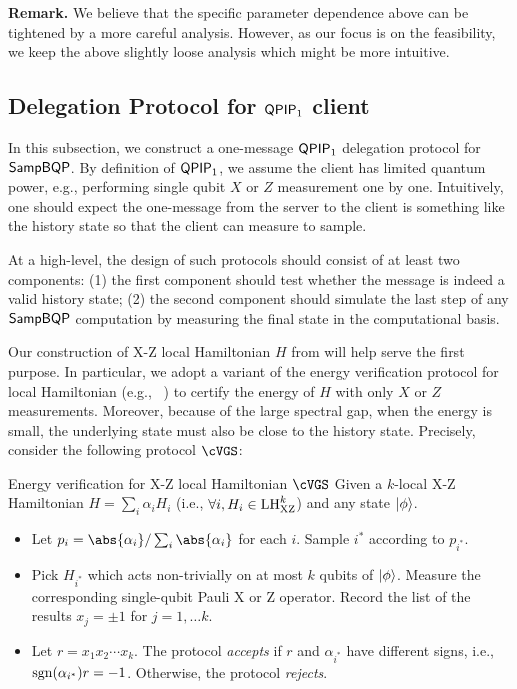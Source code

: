 \noindent \textbf{Remark.} We believe that the specific parameter dependence above can be tightened by a more careful analysis. However, as our focus is on the feasibility, we keep the above slightly loose analysis which might be more intuitive. 


\subsection{Delegation Protocol for $\operatorname{\mathsf{QPIP}}_1$ client}
\label{sec:qpip1}
In this subsection, we construct a one-message $\operatorname{\mathsf{QPIP}}_1$ delegation protocol for $\operatorname{\mathsf{SampBQP}}$. By definition of $\operatorname{\mathsf{QPIP}}_1$, we assume the client has limited quantum power, e.g., performing single qubit $X$ or $Z$ measurement one by one.
Intuitively, one should expect the one-message from the server to the client is something like the history state so that the client can measure to sample.  

At a high-level, the design of such protocols should consist of at least two components: (1) the first component should test whether the message is indeed a valid history state; (2) the second component should simulate the last step of any $\operatorname{\mathsf{SampBQP}}$ computation by measuring the final state in the computational basis.

Our construction of X-Z local Hamiltonian $H$ from  will help serve the first purpose.
In particular, we adopt a variant of the energy verification protocol for local Hamiltonian (e.g., ~\cite{mf16, PhysRevA.93.022326}) to certify the energy of $H$ with only $X$ or $Z$ measurements.
Moreover, because of the large spectral gap, when the energy is small, the underlying state must also be close to the history state.
Precisely, consider the following protocol $\cVGS$:

\begin{protocol}{Energy verification for X-Z local Hamiltonian $\cVGS$} \label{AlgGroundStateCheck}
Given a $k$-local X-Z Hamiltonian
$H=\sum_i \alpha_{i} H_i$ (i.e., $\forall i, H_i \in \mathrm{LH}_{\mathrm{XZ}}^{k}$) and any state $\ket{\phi}$.

\begin{itemize}
\item Let $p_i= \abs{\alpha_i}/\sum_i \abs{\alpha_i}$ for each $i$. Sample $i^*$ according to $p_{i^*}$.
\item Pick $H_{i^*}$ which acts non-trivially on at most $k$ qubits of $\ket{\phi}$. Measure the corresponding single-qubit Pauli X or Z operator.
Record the list of the results $x_j=\pm 1$ for $j=1, \ldots k$.
\item Let $r=x_1x_2\cdots x_k$. The protocol \emph{accepts} if $r$ and $\alpha_{i^*}$ have different signs, i.e., $\operatorname{sgn}(\alpha_{i^*})r=-1$. Otherwise, the protocol \emph{rejects}.
\end{itemize}
\end{protocol}

